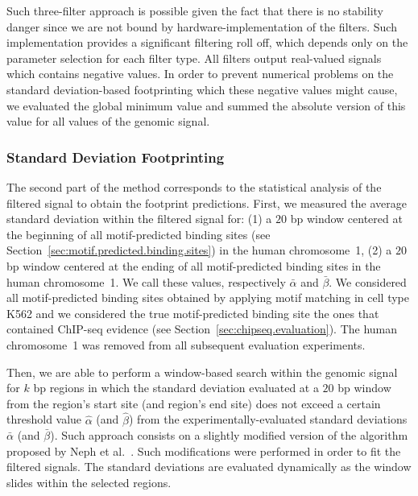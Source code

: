 Such three-filter approach is possible given the fact that there is no stability danger since we are not bound by hardware-implementation of the filters. Such implementation provides a significant filtering roll off, which depends only on the parameter selection for each filter type. All filters output real-valued signals which contains negative values. In order to prevent numerical problems on the standard deviation-based footprinting which these negative values might cause, we evaluated the global minimum value and summed the absolute version of this value for all values of the genomic signal.

\subsubsection{Standard Deviation Footprinting}
\label{sec:standard.deviation.footprinting}

The second part of the method corresponds to the statistical analysis of the filtered signal to obtain the footprint predictions. First, we measured the average standard deviation within the filtered signal for: (1) a $20$ bp window centered at the beginning of all motif-predicted binding sites (see Section~\ref{sec:motif.predicted.binding.sites}) in the human chromosome~1, (2) a $20$ bp window centered at the ending of all motif-predicted binding sites in the human chromosome~1. We call these values, respectively $ \bar{\alpha} $ and $ \bar{\beta} $. We considered all motif-predicted binding sites obtained by applying motif matching in cell type K562 and we considered the true motif-predicted binding site the ones that contained ChIP-seq evidence (see Section~\ref{sec:chipseq.evaluation}). The human chromosome~1 was removed from all subsequent evaluation experiments.

Then, we are able to perform a window-based search within the genomic signal for $ k $ bp regions in which the standard deviation evaluated at a $20$ bp window from the region's start site (and region's end site) does not exceed a certain threshold value $ \hat{\alpha} $ (and $ \hat{\beta} $) from the experimentally-evaluated standard deviations $ \bar{\alpha} $ (and $ \bar{\beta} $). Such approach consists on a slightly modified version of the algorithm proposed by Neph et al.~\cite{neph2012a}. Such modifications were performed in order to fit the filtered signals. The standard deviations are evaluated dynamically as the window slides within the selected regions.

